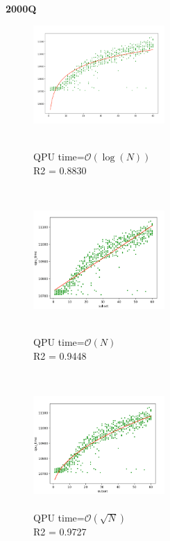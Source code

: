 \documentclass[oneside,a4paper]{article}
\begin{document}
\textbf{2000Q}

\begin{figure}[htp]
\begin{minipage}[b]{5cm}
\includegraphics[width=5cm]{LaTeXTemplate/Images/2000QpossibleFitting1.png}
\caption{\\QPU time=$\mathcal{O}(\log(N))$\\
R2 = 0.8830\\
}
\end{minipage}
\ \hspace{2mm} \hspace{2mm} \
\begin{minipage}[b]{5cm}
\includegraphics[width=5cm]{LaTeXTemplate/Images/2000QpossibleFitting2.png}
\caption{\\QPU time=$\mathcal{O}(N)$\\
R2 = 0.9448\\}
\end{minipage}
\ \hspace{2mm} \hspace{2mm} \
\begin{minipage}[b]{5cm}
\centering
\includegraphics[width=5cm]{LaTeXTemplate/Images/2000QpossibleFitting3.png}
\caption{\\QPU time=$\mathcal{O}(\sqrt{N})$\\
{\color{ForestGreen}R2 = 0.9727\\}}
\end{minipage}
\end{figure}
\end{document}
